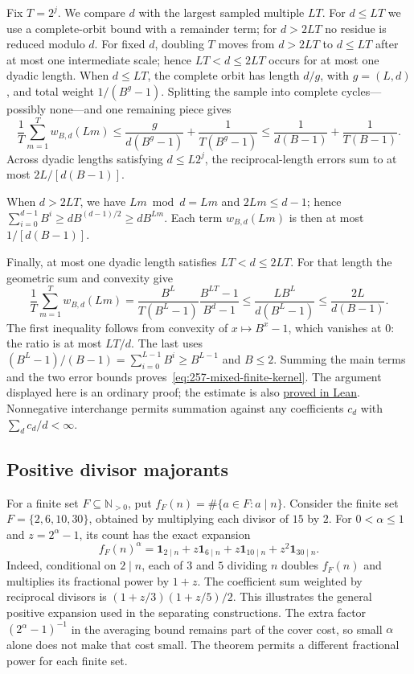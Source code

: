 \documentclass[11pt]{article}
\theoremstyle{plain}
\theoremstyle{definition}
\theoremstyle{remark}
\newcommand{\Npos}{\mathbb{N}_{>0}}
\begin{document}
Fix $T=2^j$. We compare $d$ with the largest sampled multiple $LT$.
For $d\le LT$ we use a complete-orbit bound with a remainder term;
for $d>2LT$ no residue is reduced modulo $d$. For fixed $d$, doubling
$T$ moves from $d>2LT$ to $d\le LT$ after at most one intermediate
scale; hence $LT<d\le2LT$ occurs for at most one dyadic length.
When $d\le LT$, the complete orbit has length $d/g$, with $g=(L,d)$,
and total weight $1/(B^g-1)$. Splitting the sample into complete
cycles---possibly none---and one remaining piece gives
\[
 \frac1T\sum_{m=1}^T w_{B,d}(Lm)
 \le\frac{g}{d(B^g-1)}+\frac1{T(B^g-1)}
 \le\frac1{d(B-1)}+\frac1{T(B-1)}.
\]
Across dyadic lengths satisfying $d\le L2^j$, the reciprocal-length
errors sum to at most $2L/[d(B-1)]$.
\par
\begin{samepage}
\noindent
When $d>2LT$, we have $Lm\bmod d=Lm$ and $2Lm\le d-1$; hence
$\sum_{i=0}^{d-1}B^i\ge dB^{(d-1)/2}\ge dB^{Lm}$.
Each term $w_{B,d}(Lm)$ is then at most $1/[d(B-1)]$.
\par
\end{samepage}
Finally, at most one dyadic length satisfies $LT<d\le2LT$.
For that length the geometric sum and convexity give
\[
 \frac1T\sum_{m=1}^T w_{B,d}(Lm)
 =\frac{B^L}{T(B^L-1)}\frac{B^{LT}-1}{B^d-1}
 \le\frac{LB^L}{d(B^L-1)}
 \le\frac{2L}{d(B-1)}.
\]
The first inequality follows from convexity of $x\mapsto B^x-1$,
which vanishes at $0$: the ratio is at most $LT/d$. The last uses
$(B^L-1)/(B-1)=\sum_{i=0}^{L-1}B^i\ge B^{L-1}$ and $B\le2$.
Summing the main terms and the two error bounds proves~\eqref{eq:257-mixed-finite-kernel}.
The argument displayed here is an ordinary proof; the estimate is also
\href{https://github.com/wcook04/plectis-erdos/blob/c91562bd574a387cde904481e609c7b4cacebb14/lean/ErdosProblems/Erdos257/PaperCompleteR8/DyadicKernel.lean\#L206}{proved in Lean}.
Nonnegative interchange permits summation against any coefficients $c_d$
with $\sum_dc_d/d<\infty$.

\subsection{Positive divisor majorants}
For a finite set $F\subseteq\Npos$, put
$f_F(n)=\#\{a\in F:a\mid n\}$. Consider the finite set
$F=\{2,6,10,30\}$, obtained by multiplying each divisor of $15$ by $2$.
For $0<\alpha\le1$
and $z=2^\alpha-1$, its count has the exact expansion
\[
 f_F(n)^\alpha
 =\mathbf1_{2\mid n}+z\mathbf1_{6\mid n}
  +z\mathbf1_{10\mid n}+z^2\mathbf1_{30\mid n}.
\]
Indeed, conditional on $2\mid n$, each of $3$ and $5$ dividing $n$
doubles $f_F(n)$ and multiplies its fractional power by $1+z$.
The coefficient sum weighted by reciprocal divisors is
$(1+z/3)(1+z/5)/2$. This illustrates the general positive expansion
used in the separating constructions. The extra factor
$(2^\alpha-1)^{-1}$ in the averaging bound remains part of the
cover cost, so small $\alpha$ alone does not make that cost small.
The theorem permits a different fractional power for each finite set.
\end{document}
